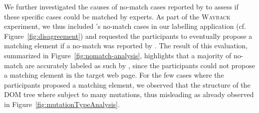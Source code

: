 \documentclass[preprint, 12pt]{elsarticle}
\begin{document}
\begin{table}[h]
    \caption{Confusion matrix on the \textsc{Wayback} dataset.}\label{tab:labels}
    \centering
\end{table}

We further investigated the causes of \textsf{no-match} cases reported by \erratum{} to assess if these specific cases could be matched by experts.
As part of the \textsc{Wayback} experiment, we thus included \erratum's \textsf{no-match} cases in our labelling application (cf. Figure~\ref{fig:disagreement}) and requested the participants to eventually propose a matching element if a \textsf{no-match} was reported by \erratum{}.
The result of this evaluation, summarized in Figure~\ref{fig:nomatch-analysis}, highlights that a majority of \textsf{no-match} are accurately labeled as such by \erratum{}, since the participants could not propose a matching element in the target web page. 
For the few cases where the participants proposed a matching element, we observed that the structure of the DOM tree where subject to many mutations, thus misleading \erratum{} as already observed in Figure~\ref{fig:mutationTypeAnalysis}.
\end{document}
